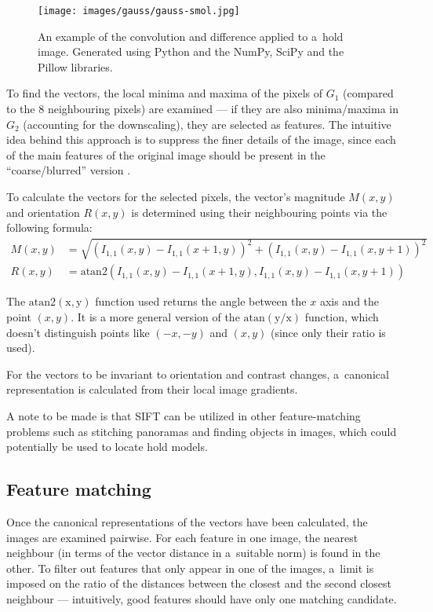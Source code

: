 \begin{figure}
	\centering
	\texttt{[image: images/gauss/gauss-smol.jpg]}
	\caption{An example of the convolution and difference applied to a~hold image. Generated using Python and the NumPy, SciPy and the Pillow libraries.}
	\label{fig:gaussexample}
\end{figure}

To find the vectors, the local minima and maxima of the pixels of $G_1$ (compared to the 8 neighbouring pixels) are examined --- if they are also minima/maxima in $G_2$ (accounting for the downscaling), they are selected as features.
The intuitive idea behind this approach is to suppress the finer details of the image, since each of the main features of the original image should be present in the ``coarse/blurred'' version \cite{scalespace}.

To calculate the vectors for the selected pixels, the vector's magnitude $M(x,y)$ and orientation $R(x,y)$ is determined using their neighbouring points via the following formula:
\begin{align}
	M(x,y) &= \sqrt{\left(I_{1,1}(x, y) - I_{1,1}(x + 1, y)\right)^2 + \left(I_{1,1}(x,y) - I_{1,1}(x, y + 1)\right)^2} \\[0.7em]
	R(x,y) &= \mathrm{atan2} \left(I_{1,1}(x, y) - I_{1,1}(x + 1, y), I_{1,1}(x,y) - I_{1,1}(x, y + 1)\right)
\end{align}

The $\mathrm{atan2(x, y)}$ function used returns the angle between the $x$ axis and the point $(x, y)$.
It is a more general version of the $\mathrm{atan(y/x)}$ function, which doesn't distinguish points like $(-x, -y)$ and $(x, y)$ (since only their ratio is used).

For the vectors to be invariant to orientation and contrast changes, a~canonical representation is calculated from their local image gradients.

A note to be made is that SIFT can be utilized in other feature-matching problems such as stitching panoramas and finding objects in images, which could potentially be used to locate hold models.

\subsection{Feature matching}
Once the canonical representations of the vectors have been calculated, the images are examined pairwise.
For each feature in one image, the nearest neighbour (in terms of the vector distance in a~suitable norm) is found in the other.
To filter out features that only appear in one of the images, a~limit is imposed on the ratio of the distances between the closest and the second closest neighbour --- intuitively, good features should have only one matching candidate.

